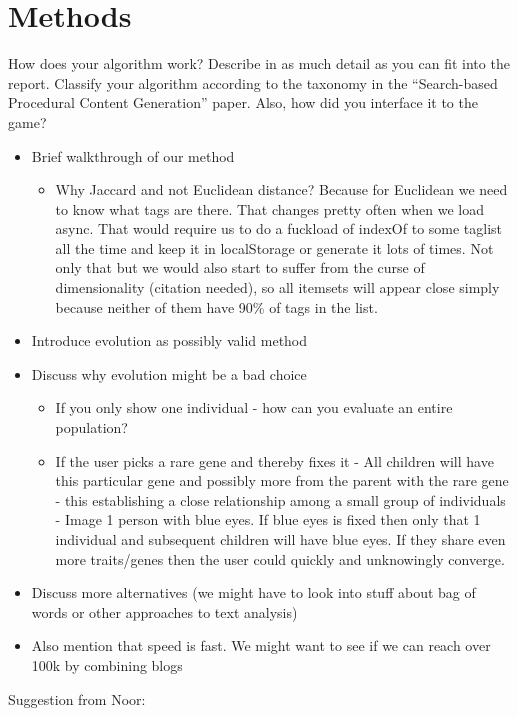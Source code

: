 \documentclass[]{article}
\begin{document}
\section{Methods}
\label{sec:Methods}
\begin{framed}
How does your algorithm work? Describe in as much detail as you can fit into the report. Classify your algorithm according to the taxonomy in the “Search-based Procedural Content Generation” paper. Also, how did you interface it to the game?
\end{framed}
\begin{itemize}
\item Brief walkthrough of our method
	\begin{itemize}
	\item Why Jaccard and not Euclidean distance? Because for Euclidean we need to know what tags are there. That changes pretty often when we load async. That would require us to do a fuckload of indexOf to some taglist all the time and keep it in localStorage or generate it lots of times. Not only that but we would also start to suffer from the curse of dimensionality (citation needed), so all itemsets will appear close simply because neither of them have 90\% of tags in the list.
	\end{itemize}
\item Introduce evolution as possibly valid method
\item Discuss why evolution might be a bad choice
	\begin{itemize}
	\item If you only show one individual - how can you evaluate an entire population?
	\item If the user picks a rare gene and thereby fixes it - All children will have this particular gene and possibly more from the parent with the rare gene - this establishing a close relationship among a small group of individuals - Image 1 person with blue eyes. If blue eyes is fixed then only that 1 individual and subsequent children will have blue eyes. If they share even more traits/genes then the user could quickly and unknowingly converge.
	\end{itemize}
\item Discuss more alternatives (we might have to look into stuff about bag of words or other approaches to text analysis)
\item Also mention that speed is fast. We might want to see if we can reach over 100k by combining blogs
\end{itemize}
Suggestion from Noor:
\end{document}
